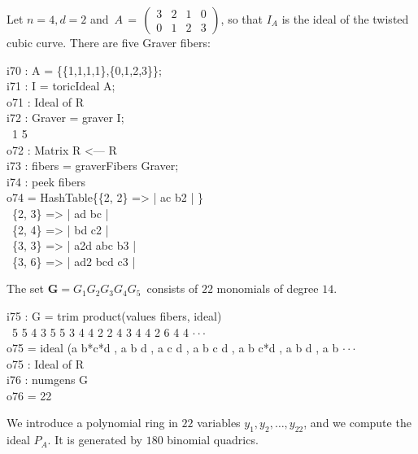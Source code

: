 \begin{example} \rm
Let $n=4,d=2$ and 
 $\, A \, = \, \left( \begin{array}{cccc}
3 & 2 & 1 & 0 \\
0 & 1 & 2 & 3 
 \end{array} \right) $,
so that $I_A$ is the ideal of the twisted cubic curve.
There are five Graver fibers:

\beginOutput
i70 : A = \{\{1,1,1,1\},\{0,1,2,3\}\};\\
\endOutput
\beginOutput
i71 : I = toricIdeal A;\\
\emptyLine
o71 : Ideal of R\\
\endOutput
\beginOutput
i72 : Graver = graver I;\\
\emptyLine
\              1       5\\
o72 : Matrix R  <--- R\\
\endOutput
\beginOutput
i73 : fibers = graverFibers Graver;\\
\endOutput
\beginOutput
i74 : peek fibers\\
\emptyLine
o74 = HashTable\{\{2, 2\} => | ac b2 |     \}\\
\                \{2, 3\} => | ad bc |\\
\                \{2, 4\} => | bd c2 |\\
\                \{3, 3\} => | a2d abc b3 |\\
\                \{3, 6\} => | ad2 bcd c3 |\\
\endOutput

The set ${\mathbf G} = G_1 G_2 G_3 G_4 G_5 \,$ consists of
$22$ monomials of degree $14$.

\beginOutput
i75 : G = trim product(values fibers, ideal)\\
\emptyLine
\              5     5   4 3 5   5 3 4   4 2 2 4   3 4   4   2 6 4   4  $\cdot\cdot\cdot$\\
o75 = ideal (a b*c*d , a b d , a c d , a b c d , a b c*d , a b d , a b $\cdot\cdot\cdot$\\
\emptyLine
o75 : Ideal of R\\
\endOutput
\beginOutput
i76 : numgens G\\
\emptyLine
o76 = 22\\
\endOutput

We introduce a polynomial ring in $22$ variables
$y_1,y_2,\ldots,y_{22}$, and we compute the ideal $P_A$.
It is generated by $180$ binomial quadrics. 


\end{example}
